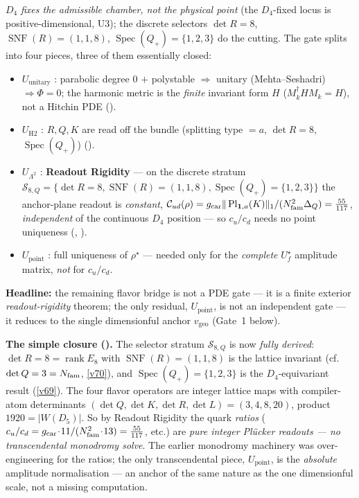 \begin{keybox}
$D_4$ \emph{fixes the admissible chamber, not the physical point} (the $D_4$-fixed locus is
positive-dimensional, U3); the discrete selectors $\det R=8$, $\operatorname{SNF}(R)=(1,1,8)$,
$\operatorname{Spec}(Q_+)=\{1,2,3\}$ do the cutting. The gate splits into four pieces, three of them
essentially closed:
\begin{itemize}
\item $U_{\mathrm{unitary}}$ \mE: parabolic degree $0$ $+$ polystable $\Rightarrow$ unitary (Mehta--Seshadri)
  $\Rightarrow\Phi=0$; the harmonic metric is the \emph{finite} invariant form $H$ ($M_k^\dagger HM_k=H$),
  not a Hitchin PDE ().
\item $U_{\mathrm{H2}}$ \mE: $R,Q,K$ are read off the bundle (splitting type $=a$, $\det R=8$,
  $\operatorname{Spec}(Q_+)$) ().
\item $U_{\Lambda^2}$ \mE: \textbf{Readout Rigidity} --- on the discrete stratum
  $\mathcal S_{8,Q}=\{\det R=8,\operatorname{SNF}(R)=(1,1,8),\operatorname{Spec}(Q_+)=\{1,2,3\}\}$ the
  anchor-plane readout is \emph{constant},
  $\mathcal C_{ud}(\rho)=g_{\mathrm{car}}\|\operatorname{Pl}_{\mathbf1,a}(K)\|_1/(N_{\mathrm{fam}}^2\Delta_Q)=\tfrac{55}{117}$,
  \emph{independent} of the continuous $D_4$ position --- so $c_u/c_d$ needs no point uniqueness
  (, ).
\item $U_{\mathrm{point}}$ \mO: full uniqueness of $\rho^\star$ --- needed only for the \emph{complete}
  $U_f^\star$ amplitude matrix, \emph{not} for $c_u/c_d$.
\end{itemize}
\textbf{Headline:} the remaining flavor bridge is not a PDE gate --- it is a finite exterior
\emph{readout-rigidity} theorem; the only residual, $U_{\mathrm{point}}$, is not an independent gate ---
it reduces to the single dimensionful anchor $v_{\mathrm{geo}}$ (Gate~1 below).

\smallskip\noindent\textbf{The simple closure ().} The selector stratum
$\mathcal S_{8,Q}$ is now \emph{fully derived}: $\det R=8=\operatorname{rank}E_8$ with $\operatorname{SNF}(R)=(1,1,8)$
is the lattice invariant (cf.\ $\det Q=3=N_{\mathrm{fam}}$, \vref{v70}), and $\operatorname{Spec}(Q_+)=\{1,2,3\}$ is the
$D_4$-equivariant result (\vref{v69}). The four flavor operators are integer lattice maps with compiler-atom
determinants $(\det Q,\det K,\det R,\det L)=(3,4,8,20)$, product $1920=|W(D_5)|$. So by Readout Rigidity the
quark \emph{ratios} ($c_u/c_d=g_{\mathrm{car}}\!\cdot\!11/(N_{\mathrm{fam}}^2\!\cdot\!13)=\tfrac{55}{117}$, etc.) are
\emph{pure integer Pl\"ucker readouts --- no transcendental monodromy solve}. The earlier monodromy
machinery was over-engineering for the ratios; the only transcendental piece, $U_{\mathrm{point}}$, is the
\emph{absolute} amplitude normalisation --- an anchor of the same nature as the one dimensionful scale, not
a missing computation.


\end{keybox}
